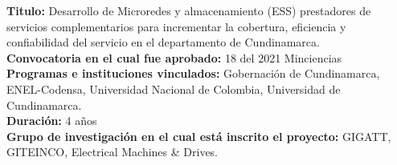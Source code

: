 \vspace*{0.05\baselineskip}
\textbf{Titulo:} Desarrollo de Microredes y almacenamiento (ESS) prestadores de
servicios complementarios para incrementar la cobertura, eficiencia y confiabilidad del servicio en el departamento de Cundinamarca.\\
\noindent
\textbf{Convocatoria en el cual fue aprobado:} 18 del 2021 Minciencias\\
\textbf{Programas e instituciones vinculados:} Gobernación de Cundinamarca, ENEL-Codensa, Universidad Nacional de Colombia, Universidad de Cundinamarca.\\
\textbf{Duración:} 4 años\\
\textbf{Grupo de investigación en el cual está inscrito el proyecto:} GIGATT, GITEINCO, Electrical Machines \& Drives.